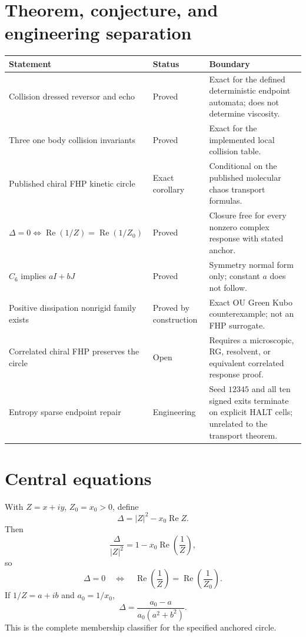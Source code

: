 \documentclass[11pt,a4paper]{article}
\newcommand{\RePart}{\operatorname{Re}}
\begin{document}
\section*{Theorem, conjecture, and engineering separation}
\begin{longtable}{p{}p{}p{}}
\toprule
Statement & Status & Boundary \\
\midrule
\endhead
Collision dressed reversor and echo & Proved & Exact for the defined deterministic endpoint automata; does not determine viscosity.\\
Three one body collision invariants & Proved & Exact for the implemented local collision table.\\
Published chiral FHP kinetic circle & Exact corollary & Conditional on the published molecular chaos transport formulas.\\
$\Delta=0\iff\RePart(1/Z)=\RePart(1/Z_0)$ & Proved & Closure free for every nonzero complex response with stated anchor.\\
$C_6$ implies $aI+bJ$ & Proved & Symmetry normal form only; constant $a$ does not follow.\\
Positive dissipation nonrigid family exists & Proved by construction & Exact OU Green Kubo counterexample; not an FHP surrogate.\\
Correlated chiral FHP preserves the circle & Open & Requires a microscopic, RG, resolvent, or equivalent correlated response proof.\\
Entropy sparse endpoint repair & Engineering & Seed $12345$ and all ten signed exits terminate on explicit HALT cells; unrelated to the transport theorem.\\
\bottomrule
\end{longtable}

\section*{Central equations}
With $Z=x+iy$, $Z_0=x_0>0$, define
\begin{equation}
 \Delta=|Z|^2-x_0\operatorname{Re}Z.
\end{equation}
Then
\begin{equation}
 \frac{\Delta}{|Z|^2}=1-x_0\operatorname{Re}\left(\frac1Z\right),
\end{equation}
so
\begin{equation}
 \Delta=0
 \quad\Longleftrightarrow\quad
 \operatorname{Re}\left(\frac1Z\right)=\operatorname{Re}\left(\frac1{Z_0}\right).
\end{equation}
If $1/Z=a+ib$ and $a_0=1/x_0$,
\begin{equation}
 \Delta=\frac{a_0-a}{a_0(a^2+b^2)}.
\end{equation}
This is the complete membership classifier for the specified anchored circle.
\end{document}
